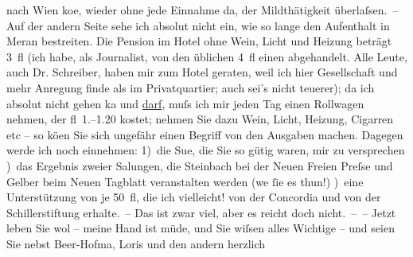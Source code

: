 \begin{ledgroupsized}[t]{13cm}
                    nach Wien ko{\geminationm}e,
                    wieder ohne jede Einnahme da, der Mildthätigkeit überlaſsen. – Auf der andern
                    Seite sehe ich absolut nicht ein, wie so lange den Aufenthalt in Meran bestreiten. Die Pension im Hotel ohne
                    Wein, Licht und Heizung beträgt 3 fl (ich habe, als Journalist, von den üblichen
                    4 fl einen abgehandelt. Alle Leute, auch Dr. Schreiber, haben mir zum Hotel geraten, weil ich hier Gesellschaft und
                    mehr Anregung finde als im Privatquartier; auch sei’s nicht teuerer); da ich
                    absolut nicht gehen ka{\geminationn} und \uline{darf}, muſs ich mir jeden Tag einen Rollwagen nehmen, der
                    fl 1.–1.20 kostet; nehmen Sie dazu Wein, Licht, Heizung, Cigarren etc – so kö{\geminationn}en Sie sich ungefähr einen Begriff von den
                    Ausgaben machen. Dagegen werde ich noch einnehmen: \pend
           \pstart
           {\pb}1) die Su{\geminationm}e,
                    die Sie so gütig waren, mir zu versprechen\pend
           ) das Ergebnis zweier Sa{\geminationm}lungen, die Steinbach bei der Neuen Freien Preſse und Gelber beim Neuen Tagblatt
                    veranstalten werden (we{\geminationn}{ }ſie es thun!)\pend
           ) eine Unterstützung von je 50 fl, die ich vielleicht! von der Concordia und von der Schillerstiftung erhalte. – Das ist zwar viel, aber es reicht doch
                    nicht. – –\pend
           \pstart
           Jetzt leben Sie wol – meine Hand ist müde, und Sie wiſsen alles Wichtige – und
                    seien Sie nebst Beer-Hofma{\geminationn}, Loris und den andern herzlich

\end{ledgroupsized}
